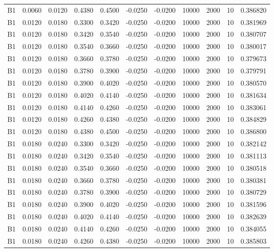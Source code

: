 \documentclass{article}
\begin{document}
\begin{longtable}{l r r r r r r r r r l}
B1 & 0.0060 & 0.0120 & 0.4380 & 0.4500 & -0.0250 & -0.0200 & 10000 & 2000 & 10 & 0.386820 \\
B1 & 0.0120 & 0.0180 & 0.3300 & 0.3420 & -0.0250 & -0.0200 & 10000 & 2000 & 10 & 0.381969 \\
B1 & 0.0120 & 0.0180 & 0.3420 & 0.3540 & -0.0250 & -0.0200 & 10000 & 2000 & 10 & 0.380707 \\
B1 & 0.0120 & 0.0180 & 0.3540 & 0.3660 & -0.0250 & -0.0200 & 10000 & 2000 & 10 & 0.380017 \\
B1 & 0.0120 & 0.0180 & 0.3660 & 0.3780 & -0.0250 & -0.0200 & 10000 & 2000 & 10 & 0.379673 \\
B1 & 0.0120 & 0.0180 & 0.3780 & 0.3900 & -0.0250 & -0.0200 & 10000 & 2000 & 10 & 0.379791 \\
B1 & 0.0120 & 0.0180 & 0.3900 & 0.4020 & -0.0250 & -0.0200 & 10000 & 2000 & 10 & 0.380570 \\
B1 & 0.0120 & 0.0180 & 0.4020 & 0.4140 & -0.0250 & -0.0200 & 10000 & 2000 & 10 & 0.381634 \\
B1 & 0.0120 & 0.0180 & 0.4140 & 0.4260 & -0.0250 & -0.0200 & 10000 & 2000 & 10 & 0.383061 \\
B1 & 0.0120 & 0.0180 & 0.4260 & 0.4380 & -0.0250 & -0.0200 & 10000 & 2000 & 10 & 0.384829 \\
B1 & 0.0120 & 0.0180 & 0.4380 & 0.4500 & -0.0250 & -0.0200 & 10000 & 2000 & 10 & 0.386800 \\
B1 & 0.0180 & 0.0240 & 0.3300 & 0.3420 & -0.0250 & -0.0200 & 10000 & 2000 & 10 & 0.382142 \\
B1 & 0.0180 & 0.0240 & 0.3420 & 0.3540 & -0.0250 & -0.0200 & 10000 & 2000 & 10 & 0.381113 \\
B1 & 0.0180 & 0.0240 & 0.3540 & 0.3660 & -0.0250 & -0.0200 & 10000 & 2000 & 10 & 0.380518 \\
B1 & 0.0180 & 0.0240 & 0.3660 & 0.3780 & -0.0250 & -0.0200 & 10000 & 2000 & 10 & 0.380381 \\
B1 & 0.0180 & 0.0240 & 0.3780 & 0.3900 & -0.0250 & -0.0200 & 10000 & 2000 & 10 & 0.380729 \\
B1 & 0.0180 & 0.0240 & 0.3900 & 0.4020 & -0.0250 & -0.0200 & 10000 & 2000 & 10 & 0.381596 \\
B1 & 0.0180 & 0.0240 & 0.4020 & 0.4140 & -0.0250 & -0.0200 & 10000 & 2000 & 10 & 0.382639 \\
B1 & 0.0180 & 0.0240 & 0.4140 & 0.4260 & -0.0250 & -0.0200 & 10000 & 2000 & 10 & 0.384055 \\
B1 & 0.0180 & 0.0240 & 0.4260 & 0.4380 & -0.0250 & -0.0200 & 10000 & 2000 & 10 & 0.385803 \\

\end{longtable}
\end{document}
